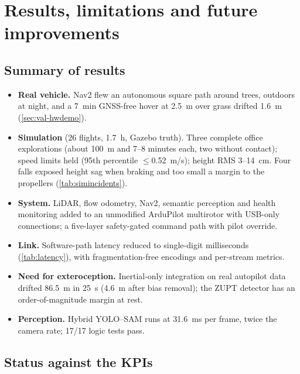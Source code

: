 \section{Results, limitations and future improvements}
\label{sec:discussion}

\subsection{Summary of results}

\begin{itemize}[leftmargin=*,itemsep=1pt]
  \item \textbf{Real vehicle.} Nav2 flew an autonomous square path around trees,
    outdoors at night, and a \SI{7}{\minute} GNSS-free  hover at \SI{2.5}{\metre} over grass drifted
    \SI{1.6}{\metre} (\cref{sec:val-hwdemo}).
  \item \textbf{Simulation} (26 flights, \SI{1.7}{h}, Gazebo truth). Three complete
    office explorations (about \SI{100}{m} and 7--8 minutes each, two without contact);
    speed limits held (95th percentile $\le$\SI{0.52}{m/s}); height RMS 3--\SI{14}{cm}.
    Four falls exposed height sag when braking and too small a margin to the propellers
    (\cref{tab:simincidents}).
  \item \textbf{System.} LiDAR, flow odometry, Nav2, semantic perception and health
    monitoring added to an unmodified ArduPilot multirotor with USB-only connections;
    a five-layer safety-gated command path with pilot override.
  \item \textbf{Link.} Software-path latency reduced to single-digit milliseconds
    (\cref{tab:latency}), with fragmentation-free encodings and per-stream metrics.
  \item \textbf{Need for exteroception.} Inertial-only integration on real autopilot data
    drifted \SI{86.5}{\metre} in \SI{25}{\second} (\SI{4.6}{\metre} after bias removal);
    the ZUPT detector has an order-of-magnitude margin at rest.
  \item \textbf{Perception.} Hybrid YOLO--SAM runs at \SI{31.6}{\milli\second} per frame,
    twice the camera rate; 17/17 logic tests pass.
\end{itemize}

\subsection{Status against the KPIs}

